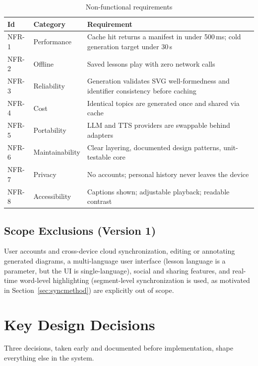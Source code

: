 \begin{table}[htbp]
\caption{Non-functional requirements}
\label{tab:nfr}
\centering
\small
\renewcommand{\arraystretch}{1.3}
\begin{tabular}{@{}llp{}@{}}
\toprule
\textbf{Id} & \textbf{Category} & \textbf{Requirement}\\
\midrule
NFR-1 & Performance & Cache hit returns a manifest in under 500\,ms; cold
generation target under 30\,s\\
NFR-2 & Offline & Saved lessons play with zero network calls\\
NFR-3 & Reliability & Generation validates SVG well-formedness and identifier
consistency before caching\\
NFR-4 & Cost & Identical topics are generated once and shared via cache\\
NFR-5 & Portability & LLM and TTS providers are swappable behind adapters\\
NFR-6 & Maintainability & Clear layering, documented design patterns,
unit-testable core\\
NFR-7 & Privacy & No accounts; personal history never leaves the device\\
NFR-8 & Accessibility & Captions shown; adjustable playback; readable
contrast\\
\bottomrule
\end{tabular}
\end{table}

\subsection{Scope Exclusions (Version 1)}

User accounts and cross-device cloud synchronization, editing or annotating
generated diagrams, a multi-language user interface (lesson language is a
parameter, but the UI is single-language), social and sharing features, and
real-time word-level highlighting (segment-level synchronization is used, as
motivated in Section~\ref{sec:syncmethod}) are explicitly out of scope.

\section{Key Design Decisions}
\label{sec:decisions}

Three decisions, taken early and documented before implementation, shape
everything else in the system.

